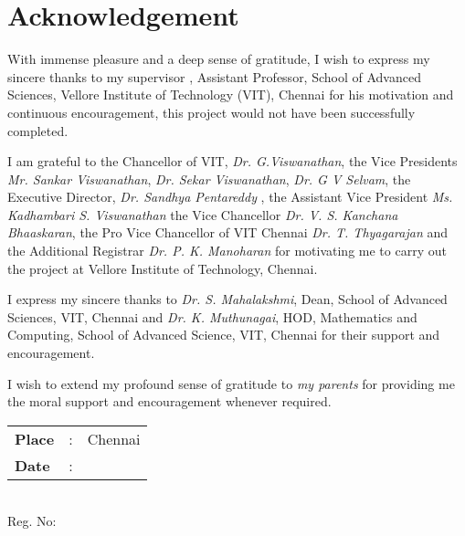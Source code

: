 \chapter*{Acknowledgement}
%

With immense pleasure and a deep sense of gratitude, I wish to express my sincere thanks to my supervisor \emph{\theguide}, Assistant Professor, School of Advanced Sciences, Vellore Institute of Technology (VIT), Chennai for his motivation and continuous encouragement, this project would not have been successfully completed.

 I am grateful to the Chancellor of VIT, {\em Dr. G.Viswanathan}, the Vice Presidents {\em Mr. Sankar Viswanathan}, {\em Dr. Sekar Viswanathan}, {\em Dr. G V Selvam}, the Executive Director, {\em Dr. Sandhya Pentareddy} , the Assistant Vice President {\em Ms. Kadhambari S. Viswanathan} the Vice Chancellor {\em Dr. V. S. Kanchana Bhaaskaran}, the Pro Vice Chancellor of VIT Chennai {\em Dr. T. Thyagarajan} and the Additional Registrar {\em Dr. P. K. Manoharan} for motivating me to carry out the project at Vellore Institute of Technology, Chennai.

 I express my sincere thanks to {\em Dr. S. Mahalakshmi}, Dean, School of Advanced Sciences, VIT, Chennai and {\em Dr. K. Muthunagai}, HOD, Mathematics and Computing, School of Advanced Science,  VIT, Chennai for their support and encouragement.


 I wish to extend my profound sense of gratitude to {\em my parents} for providing me the moral support and encouragement whenever required.   



\vspace{3\baselineskip}

\begingroup
\linespread{1} \selectfont

\begin{minipage}{.5\textwidth}
	\raggedright
	\begin{tabular}{lcl}
		\textbf{Place}  & : & Chennai \\
		\textbf{Date} & : &
	\end{tabular}
\end{minipage}%
\begin{minipage}{.5\textwidth}
		\raggedleft
		\thestudent\\
		Reg. No: \theregno\\
\end{minipage}

 \endgroup
